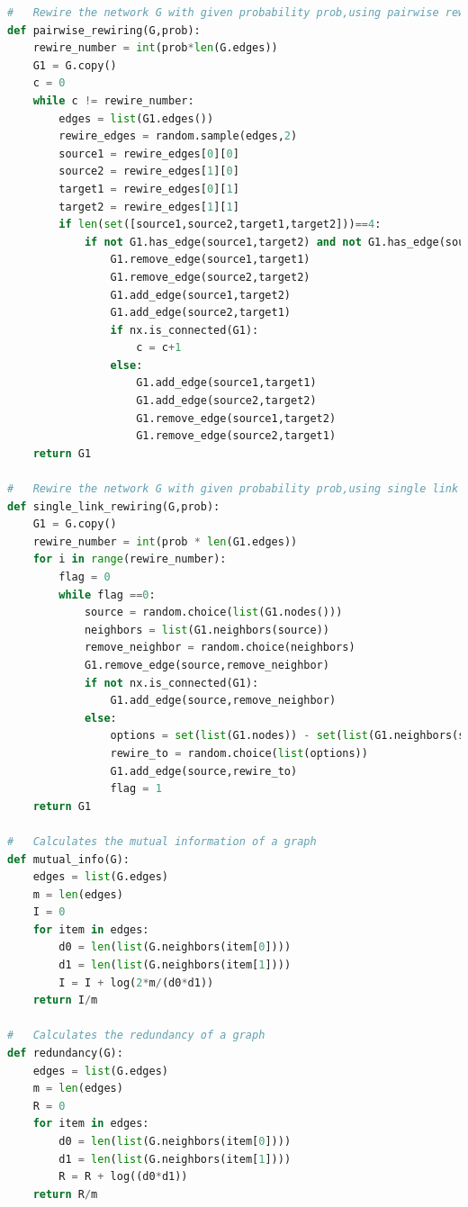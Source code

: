 \documentclass[12pt]{article}
\begin{document}
\begin{lstlisting}[language=Python,breaklines=true]
#   Rewire the network G with given probability prob,using pairwise rewiring
def pairwise_rewiring(G,prob):
    rewire_number = int(prob*len(G.edges))
    G1 = G.copy()
    c = 0 
    while c != rewire_number:
        edges = list(G1.edges())
        rewire_edges = random.sample(edges,2)
        source1 = rewire_edges[0][0]
        source2 = rewire_edges[1][0]
        target1 = rewire_edges[0][1]
        target2 = rewire_edges[1][1]
        if len(set([source1,source2,target1,target2]))==4:
            if not G1.has_edge(source1,target2) and not G1.has_edge(source2,target1):
                G1.remove_edge(source1,target1)
                G1.remove_edge(source2,target2)
                G1.add_edge(source1,target2)
                G1.add_edge(source2,target1)
                if nx.is_connected(G1):
                    c = c+1
                else:
                    G1.add_edge(source1,target1)
                    G1.add_edge(source2,target2)
                    G1.remove_edge(source1,target2)
                    G1.remove_edge(source2,target1)
    return G1

#   Rewire the network G with given probability prob,using single link rewiring
def single_link_rewiring(G,prob):
    G1 = G.copy()
    rewire_number = int(prob * len(G1.edges))
    for i in range(rewire_number):
        flag = 0
        while flag ==0:
            source = random.choice(list(G1.nodes()))
            neighbors = list(G1.neighbors(source))
            remove_neighbor = random.choice(neighbors)
            G1.remove_edge(source,remove_neighbor)
            if not nx.is_connected(G1):
                G1.add_edge(source,remove_neighbor)
            else:
                options = set(list(G1.nodes)) - set(list(G1.neighbors(source)))-set([source,remove_neighbor])
                rewire_to = random.choice(list(options))
                G1.add_edge(source,rewire_to)
                flag = 1
    return G1

#   Calculates the mutual information of a graph
def mutual_info(G):
    edges = list(G.edges)
    m = len(edges)
    I = 0
    for item in edges:
        d0 = len(list(G.neighbors(item[0])))
        d1 = len(list(G.neighbors(item[1]))) 
        I = I + log(2*m/(d0*d1))
    return I/m

#   Calculates the redundancy of a graph
def redundancy(G):
    edges = list(G.edges)
    m = len(edges)
    R = 0
    for item in edges:
        d0 = len(list(G.neighbors(item[0])))
        d1 = len(list(G.neighbors(item[1]))) 
        R = R + log((d0*d1))
    return R/m


\end{lstlisting}
\end{document}
